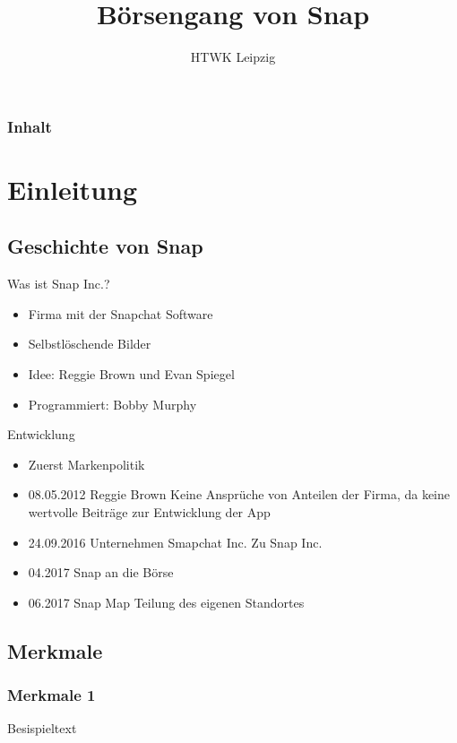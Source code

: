 \documentclass{beamer}
\title{Börsengang von Snap}
\institute{Alex Dudin, Hendrik Schick, Andre Hildebrandt}
\author[]{HTWK Leipzig} %
\begin{document}
\begin{frame}
\titlepage
\end{frame}

\begin{frame}
\frametitle{Inhalt}
\tableofcontents
\end{frame}

\section{Einleitung}

\subsection{Geschichte von Snap}
\begin{frame} {Was ist Snap Inc.?}
\begin{itemize}
\item Firma mit der Snapchat Software 
\item  Selbstlöschende Bilder
\item  Idee: Reggie Brown und Evan Spiegel
\item  Programmiert: Bobby Murphy
\end{itemize}
\end{frame}

\begin{frame} {Entwicklung}
\begin{itemize}
\item Zuerst Markenpolitik \pause
\item  08.05.2012 Reggie Brown Keine Ansprüche von Anteilen der Firma, da keine wertvolle Beiträge zur Entwicklung der App \pause
\item  24.09.2016 Unternehmen Smapchat Inc. Zu Snap Inc. \pause
\item  04.2017 Snap an die Börse \pause
\item 06.2017 Snap Map Teilung des eigenen Standortes \pause

\end{itemize}
\end{frame}
\subsection{Merkmale}

\begin{frame}
\frametitle{Merkmale 1}

Besispieltext

\end{frame}
\end{document}
